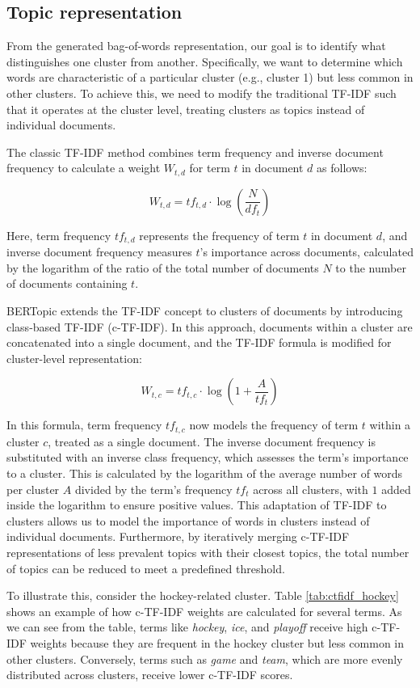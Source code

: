 \subsection{Topic representation}
From the generated bag-of-words representation, our goal is to identify what distinguishes one cluster from another. Specifically, we want to determine which words are characteristic of a particular cluster (e.g., cluster 1) but less common in other clusters. To achieve this, we need to modify the traditional TF-IDF such that it operates at the cluster level, treating clusters as topics instead of individual documents.

The classic TF-IDF \cite{joachims_probabilistic_1997} method combines term frequency and inverse document frequency to calculate a weight $W_{t,d}$ for term $t$ in document $d$ as follows:

\[ W_{t,d} = tf_{t,d} \cdot \log\left(\frac{N}{df_t}\right) \]

Here, term frequency $tf_{t,d}$ represents the frequency of term $t$ in document $d$, and inverse document frequency measures $t$'s importance across documents, calculated by the logarithm of the ratio of the total number of documents $N$ to the number of documents containing $t$.


BERTopic extends the TF-IDF concept to clusters of documents by introducing class-based TF-IDF (c-TF-IDF). In this approach, documents within a cluster are concatenated into a single document, and the TF-IDF formula is modified for cluster-level representation:

\[ W_{t,c} = tf_{t,c} \cdot \log\left(1 + \frac{A}{tf_t}\right) \]

In this formula, term frequency $tf_{t,c}$ now models the frequency of term $t$ within a cluster $c$, treated as a single document. The inverse document frequency is substituted with an inverse class frequency, which assesses the term's importance to a cluster. This is calculated by the logarithm of the average number of words per cluster $A$ divided by the term's frequency $tf_t$ across all clusters, with $1$ added inside the logarithm to ensure positive values. This adaptation of TF-IDF to clusters allows us to model the importance of words in clusters instead of individual documents. Furthermore, by iteratively merging c-TF-IDF representations of less prevalent topics with their closest topics, the total number of topics can be reduced to meet a predefined threshold.

To illustrate this, consider the hockey-related cluster. Table \ref{tab:ctfidf_hockey} shows an example of how c-TF-IDF weights are calculated for several terms. As we can see from the table, terms like \textit{hockey}, \textit{ice}, and \textit{playoff} receive high c-TF-IDF weights because they are frequent in the hockey cluster but less common in other clusters. Conversely, terms such as \textit{game} and \textit{team}, which are more evenly distributed across clusters, receive lower c-TF-IDF scores.

